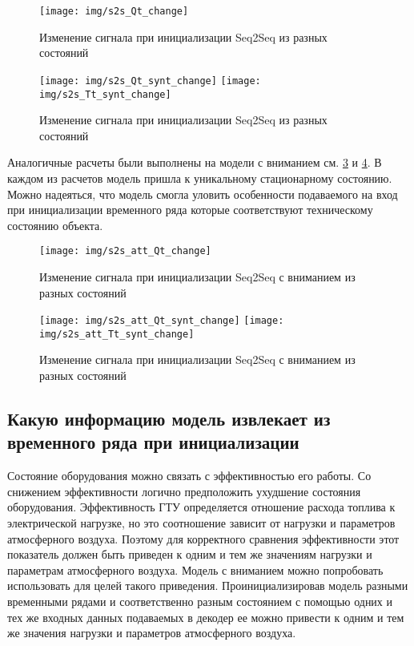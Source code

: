 \documentclass[12pt,a4paper]{article}
\begin{document}
\begin{figure}[htbp]
	\centering\texttt{[image: img/s2s\_Qt\_change]}
	\caption{Изменение сигнала при инициализации Seq2Seq из разных состояний}
	\label{fig:s2s_Qt_change}
\end{figure}

\begin{figure}[htbp]
	\centering\texttt{[image: img/s2s\_Qt\_synt\_change]}
	\centering\texttt{[image: img/s2s\_Tt\_synt\_change]}
	\caption{Изменение сигнала при инициализации Seq2Seq из разных состояний}
	\label{fig:s2s_Qt_Tt_synt_change}
\end{figure}

Аналогичные расчеты были выполнены на модели с вниманием см. \ref{fig:s2s_att_Qt_change} и \ref{fig:s2s_att_Qt_Tt_synt_change}. В каждом из расчетов модель пришла к уникальному стационарному состоянию. Можно надеяться, что модель смогла уловить особенности подаваемого на вход при инициализации временного ряда которые соответствуют техническому состоянию объекта.


\begin{figure}[htbp]
	\centering\texttt{[image: img/s2s\_att\_Qt\_change]}
	\caption{Изменение сигнала при инициализации Seq2Seq с вниманием из разных состояний}
	\label{fig:s2s_att_Qt_change}
\end{figure}

\begin{figure}[htbp]
	\centering\texttt{[image: img/s2s\_att\_Qt\_synt\_change]}
	\centering\texttt{[image: img/s2s\_att\_Tt\_synt\_change]}
	\caption{Изменение сигнала при инициализации Seq2Seq с вниманием из разных состояний}
	\label{fig:s2s_att_Qt_Tt_synt_change}
\end{figure}


\newpage
\subsection{Какую информацию модель извлекает из временного ряда при инициализации}


Состояние оборудования можно связать с эффективностью его работы. Со снижением эффективности логично предположить ухудшение состояния оборудования. Эффективность ГТУ определяется отношение расхода топлива к электрической нагрузке, но это соотношение зависит от нагрузки и параметров атмосферного воздуха. Поэтому для корректного сравнения эффективности этот показатель должен быть приведен к одним и тем же значениям нагрузки и параметрам атмосферного воздуха. Модель с вниманием можно попробовать использовать для целей такого приведения. Проинициализировав модель разными временными рядами и соответственно разным состоянием с помощью одних и тех же входных данных подаваемых в декодер ее можно привести к одним и тем же значения нагрузки и параметров атмосферного воздуха.
\end{document}
